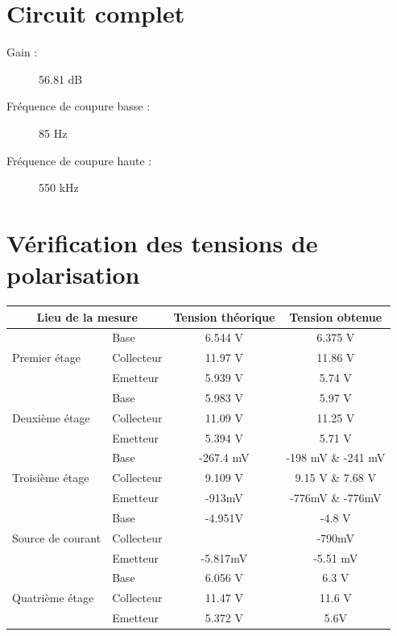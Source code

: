 \documentclass[11pt;a4paper]{report}
\begin{document}
  \section{Circuit complet}
   \begin{description}
    \item[Gain :]56.81  dB
    \item[Fréquence de coupure basse :]85 Hz
    \item[Fréquence de coupure haute :]550 kHz
   \end{description}

  \section{Vérification des tensions de polarisation}
   \begin{center}
    \begin{tabular}{|l|l|c|c|}
     \hline
     \multicolumn{2}{|c|}{Lieu de la mesure} & Tension théorique & Tension obtenue \\
     \hline
     \multirow{3}{3cm}{Premier étage} & 
     Base  & 6.544 V & 6.375 V \\
     \cline{2-4} &
     Collecteur & 11.97 V & 11.86 V \\
     \cline{2-4} &
     Emetteur & 5.939 V & 5.74 V \\
     \hline
     \multirow{3}{3cm}{Deuxième étage} & 
     Base & 5.983 V & 5.97 V \\
     \cline{2-4} &
     Collecteur & 11.09 V & 11.25 V \\
     \cline{2-4} &
     Emetteur & 5.394 V & 5.71 V \\
     \hline
     \multirow{3}{3cm}{Troisième étage} & 
     Base & -267.4 mV & -198 mV \& -241 mV\\
     \cline{2-4} &
     Collecteur & 9.109 V & 9.15 V \& 7.68 V \\
     \cline{2-4} &
     Emetteur & -913mV & -776mV \& -776mV  \\
     \hline
     \multirow{3}{3cm}{Source de courant} & 
     Base & -4.951V & -4.8 V\\
     \cline{2-4} &
     Collecteur & & -790mV \\
     \cline{2-4} &
     Emetteur & -5.817mV & -5.51 mV\\
     \hline
     \multirow{3}{3cm}{Quatrième étage} & 
     Base & 6.056 V & 6.3 V \\
     \cline{2-4} &
     Collecteur & 11.47 V & 11.6 V \\
     \cline{2-4} &
     Emetteur & 5.372 V & 5.6V  \\
     \hline
    \end{tabular}
   \end{center}
\end{document}
